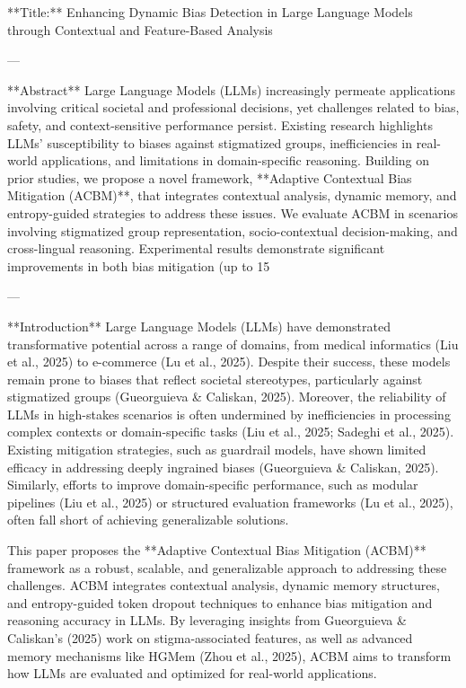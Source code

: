 **Title:** Enhancing Dynamic Bias Detection in Large Language Models through Contextual and Feature-Based Analysis  

---

**Abstract**  
Large Language Models (LLMs) increasingly permeate applications involving critical societal and professional decisions, yet challenges related to bias, safety, and context-sensitive performance persist. Existing research highlights LLMs' susceptibility to biases against stigmatized groups, inefficiencies in real-world applications, and limitations in domain-specific reasoning. Building on prior studies, we propose a novel framework, **Adaptive Contextual Bias Mitigation (ACBM)**, that integrates contextual analysis, dynamic memory, and entropy-guided strategies to address these issues. We evaluate ACBM in scenarios involving stigmatized group representation, socio-contextual decision-making, and cross-lingual reasoning. Experimental results demonstrate significant improvements in both bias mitigation (up to 15%

---

**Introduction**  
Large Language Models (LLMs) have demonstrated transformative potential across a range of domains, from medical informatics (Liu et al., 2025) to e-commerce (Lu et al., 2025). Despite their success, these models remain prone to biases that reflect societal stereotypes, particularly against stigmatized groups (Gueorguieva & Caliskan, 2025). Moreover, the reliability of LLMs in high-stakes scenarios is often undermined by inefficiencies in processing complex contexts or domain-specific tasks (Liu et al., 2025; Sadeghi et al., 2025). Existing mitigation strategies, such as guardrail models, have shown limited efficacy in addressing deeply ingrained biases (Gueorguieva & Caliskan, 2025). Similarly, efforts to improve domain-specific performance, such as modular pipelines (Liu et al., 2025) or structured evaluation frameworks (Lu et al., 2025), often fall short of achieving generalizable solutions.  

This paper proposes the **Adaptive Contextual Bias Mitigation (ACBM)** framework as a robust, scalable, and generalizable approach to addressing these challenges. ACBM integrates contextual analysis, dynamic memory structures, and entropy-guided token dropout techniques to enhance bias mitigation and reasoning accuracy in LLMs. By leveraging insights from Gueorguieva & Caliskan's (2025) work on stigma-associated features, as well as advanced memory mechanisms like HGMem (Zhou et al., 2025), ACBM aims to transform how LLMs are evaluated and optimized for real-world applications.  

